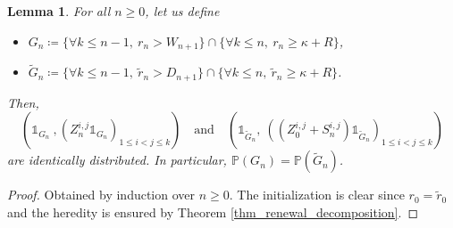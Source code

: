\documentclass[a4paper, 11pt]{article}
\theoremstyle{plain}
\newtheorem{Lemma}[Theorem]{Lemma}
\theoremstyle{definition}
\renewcommand{\P}{\mathbb{P}}
\numberwithin{equation}{section}
\begin{document}
\begin{Lemma}
    \label{lemma_indep}
    For all $n\geq 0$, let us define
        \begin{itemize}
            \item $G_n\coloneqq\{\forall k\leq n-1,~r_n>W_{n+1}\}\cap\{\forall k\leq n,~r_n\geq\kappa+R\}$,
            \item $\tilde G_n\coloneqq\{\forall k\leq n-1,~\tilde r_n>D_{n+1}\}\cap\{\forall k\leq n,~\tilde r_n\geq\kappa+R\}$.
        \end{itemize}
    Then,
        \[(\mathds 1_{G_n}~,(Z_n^{i, j}\mathds 1_{G_n})_{1\leq i<j\leq k})\quad\text{and}\quad(\mathds 1_{\tilde G_n},~((Z_0^{i, j}+S_n^{i, j})\mathds 1_{\tilde G_n})_{1\leq i<j\leq k})\]
    are identically distributed. In particular, $\P(G_n)=\P(\tilde G_n)$.
\end{Lemma}

\begin{proof}
    Obtained by induction over $n\geq 0$. The initialization is clear since $r_0=\tilde r_0$ and the heredity is ensured by Theorem \ref{thm_renewal_decomposition}.
\end{proof}
\end{document}
